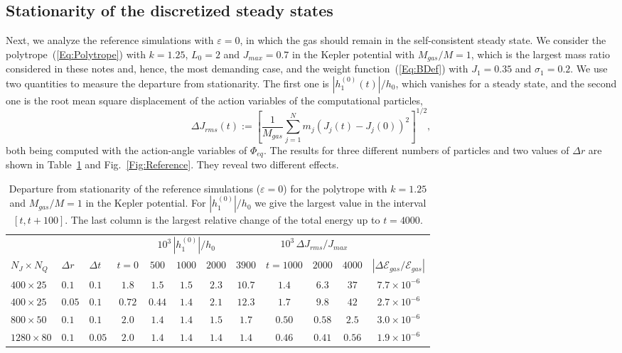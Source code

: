 \subsection{Stationarity of the discretized steady states}
\label{SubSec:ValStationarity}

Next, we analyze the reference simulations with $\varepsilon = 0$, in which the gas should remain in the self-consistent steady state. We consider the polytrope~(\ref{Eq:Polytrope}) with $k = 1.25$, $L_0 = 2$ and $J_{max} = 0.7$ in the Kepler potential with $M_{gas}/M = 1$, which is the largest mass ratio considered in these notes and, hence, the most demanding case, and the weight function~(\ref{Eq:BDef}) with $J_1 = 0.35$ and $\sigma_1 = 0.2$. We use two quantities to measure the departure from stationarity. The first one is $|h_1^{(0)}(t)|/h_0$, which vanishes for a steady state, and the second one is the root mean square displacement of the action variables of the computational particles,
\begin{equation}
\Delta J_{rms}(t) := \left[ \frac{1}{M_{gas}}\sum\limits_{j=1}^N m_j\left( J_j(t) - J_j(0) \right)^2 \right]^{1/2},
\label{Eq:DeltaJrms}
\end{equation}
both being computed with the action-angle variables of $\Phi_{eq}$. The results for three different numbers of particles and two values of $\Delta r$ are shown in Table~\ref{Tab:Reference} and Fig.~\ref{Fig:Reference}. They reveal two different effects.

\begin{table}[htp]
\begin{center}
\begin{tabular}{lll|ccccc|ccc|c}
\hline\hline
 & & & \multicolumn{5}{c|}{$10^3\, |h_1^{(0)}|/h_0$} & \multicolumn{3}{c|}{$10^3\,\Delta J_{rms}/J_{max}$} & \\
$N_J\times N_Q$ & $\Delta r$ & $\Delta t$ & $t = 0$ & $500$ & $1000$ & $2000$ & $3900$ & $t = 1000$ & $2000$ & $4000$ & $|\Delta\mathcal{E}_{gas}/\mathcal{E}_{gas}|$ \\
\hline
$400\times 25$ & $0.1$ & $0.1$ & $1.8$ & $1.5$ & $1.5$ & $2.3$ & $10.7$ & $1.4$ & $6.3$ & $37$ & $7.7\times 10^{-6}$ \\
$400\times 25$ & $0.05$ & $0.1$ & $0.72$ & $0.44$ & $1.4$ & $2.1$ & $12.3$ & $1.7$ & $9.8$ & $42$ & $2.7\times 10^{-6}$ \\
$800\times 50$ & $0.1$ & $0.1$ & $2.0$ & $1.4$ & $1.4$ & $1.5$ & $1.7$ & $0.50$ & $0.58$ & $2.5$ & $3.0\times 10^{-6}$ \\
$1280\times 80$ & $0.1$ & $0.05$ & $2.0$ & $1.4$ & $1.4$ & $1.4$ & $1.4$ & $0.46$ & $0.41$ & $0.56$ & $1.9\times 10^{-6}$ \\
\hline\hline
\end{tabular}
\end{center}
\caption{Departure from stationarity of the reference simulations ($\varepsilon = 0$) for the polytrope with $k = 1.25$ and $M_{gas}/M = 1$ in the Kepler potential. For $|h_1^{(0)}|/h_0$ we give the largest value in the interval $[t,t+100]$. The last column is the largest relative change of the total energy up to $t = 4000$.}
\label{Tab:Reference}
\end{table}

